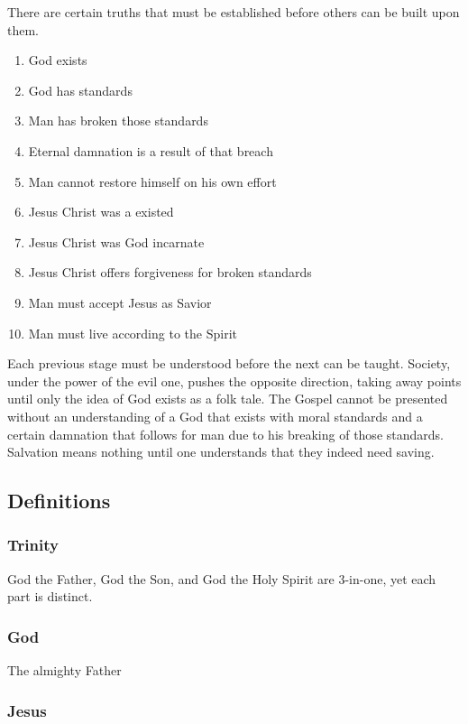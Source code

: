 \documentclass[CSHFoundation.tex]{subfiles}
\begin{document}
There are certain truths that must be established before others can be built upon them.

\begin{enumerate}
\item God exists
\item God has standards
\item Man has broken those standards
\item Eternal damnation is a result of that breach
\item Man cannot restore himself on his own effort
\item Jesus Christ was a existed
\item Jesus Christ was God incarnate
\item Jesus Christ offers forgiveness for broken standards
\item Man must accept Jesus as Savior
\item Man must live according to the Spirit
\end{enumerate}

Each previous stage must be understood before the next can be taught. Society, under the power of the evil one, pushes the opposite direction, taking away points until only the idea of God exists as a folk tale. The Gospel cannot be presented without an understanding of a God that exists with moral standards and a certain damnation that follows for man due to his breaking of those standards. Salvation means nothing until one understands that they indeed need saving.

\subsection{Definitions}

\subsubsection{Trinity}

God the Father, God the Son, and God the Holy Spirit are 3-in-one, yet each part is distinct.



\subsubsection{God}

The almighty Father



\subsubsection{Jesus}
\end{document}
